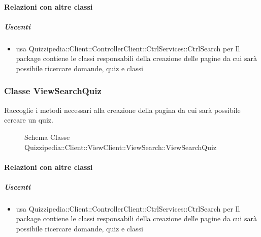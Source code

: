 \paragraph{Relazioni con altre classi}
\subparagraph{Uscenti}
\begin{itemize}
\item usa Quizzipedia::Client::ControllerClient::CtrlServices::CtrlSearch per Il package contiene le classi responsabili della creazione delle pagine da cui sarà possibile ricercare domande, quiz e classi 
\end{itemize}
\subsubsection{Classe ViewSearchQuiz}
Raccoglie i metodi necessari alla creazione della pagina da cui sarà possibile cercare un quiz.
\begin{figure}[H]
\centering
\noindent{}
\caption[Schema Classe ViewSearchQuiz]{Schema Classe Quizzipedia::Client::ViewClient::ViewSearch::ViewSearchQuiz}
\end{figure}
\paragraph{Relazioni con altre classi}
\subparagraph{Uscenti}
\begin{itemize}
\item usa Quizzipedia::Client::ControllerClient::CtrlServices::CtrlSearch per Il package contiene le classi responsabili della creazione delle pagine da cui sarà possibile ricercare domande, quiz e classi 
\end{itemize}
